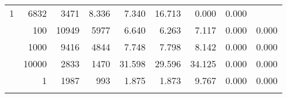 \begin{table}
\begin{tabular}{rrrrrrrrr}
					
					 
					\multirow{ 1 }{*}{ 1 } &
					
						
							    
							     6832  & 3471  
	                           & 8.336 & 7.340 & 16.713
	                           & 0.000 & 0.000  \\
	                
	            
					 &  
					 
					\multirow{ 1 }{*}{ 100 } &
					
						
							    
							     10949  & 5977  
	                           & 6.640 & 6.263 & 7.117
	                           & 0.000 & 0.000  \\
	                
	            
					 &  
					 
					\multirow{ 1 }{*}{ 1000 } &
					
						
							    
							     9416  & 4844  
	                           & 7.748 & 7.798 & 8.142
	                           & 0.000 & 0.000  \\
	                
	            
					 &  
					 
					\multirow{ 1 }{*}{ 10000 } &
					
						
							    
							     2833  & 1470  
	                           & 31.598 & 29.596 & 34.125
	                           & 0.000 & 0.000  \\
	                
	            
	        
				\noalign{\smallskip}\hline
				\multirow{ 1 }{*}{ 1999998 } &
				
					
					 
					\multirow{ 1 }{*}{ 1 } &
					
						
							    
							     1987  & 993  
	                           & 1.875 & 1.873 & 9.767
	                           & 0.000 & 0.000  \\
	                
	            
	        
				\noalign{\smallskip}\hline
				\multirow{ 4 }{*}{ 2000000 } &
				
					
					 

\end{tabular}
\end{table}
